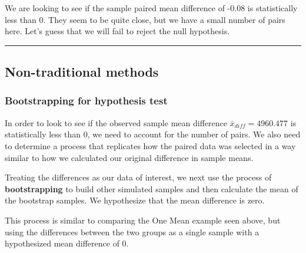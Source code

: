 \documentclass[12pt,]{krantz}
\makeatletter
\newenvironment{Shaded}{\begin{snugshade}}{\end{snugshade}}
\newcommand{\KeywordTok}[1]{\textcolor[rgb]{0.27,0.27,0.27}{\textbf{#1}}}
\newcommand{\DataTypeTok}[1]{\textcolor[rgb]{0.27,0.27,0.27}{#1}}
\newcommand{\DecValTok}[1]{\textcolor[rgb]{0.06,0.06,0.06}{#1}}
\newcommand{\StringTok}[1]{\textcolor[rgb]{0.5,0.5,0.5}{#1}}
\newcommand{\OperatorTok}[1]{\textcolor[rgb]{0.43,0.43,0.43}{\textbf{#1}}}
\newcommand{\NormalTok}[1]{#1}
\newenvironment{kframe}{%
\medskip{}
\setlength{\fboxsep}{.8em}
 \def\at@end@of@kframe{}%
 \ifinner\ifhmode%
  \def\at@end@of@kframe{\end{minipage}}%
  \begin{minipage}{\columnwidth}%
 \fi\fi%
 \def\FrameCommand##1{\hskip\@totalleftmargin \hskip-\fboxsep
 \colorbox{shadecolor}{##1}\hskip-\fboxsep
     \hskip-\linewidth \hskip-\@totalleftmargin \hskip\columnwidth}%
 \MakeFramed {\advance\hsize-\width
   \@totalleftmargin\z@ \linewidth\hsize
   \@setminipage}}%
 {\par\unskip\endMakeFramed%
 \at@end@of@kframe}
\renewenvironment{Shaded}{\begin{kframe}}{\end{kframe}}
\makeatother
\begin{document}
We are looking to see if the sample paired mean difference of -0.08 is
statistically less than 0. They seem to be quite close, but we have a
small number of pairs here. Let's guess that we will fail to reject the
null hypothesis.

\begin{center}\rule{0.5\linewidth}{\linethickness}\end{center}

\subsection{Non-traditional methods}\label{non-traditional-methods-4}

\subsubsection*{Bootstrapping for hypothesis
test}\label{bootstrapping-for-hypothesis-test-1}


In order to look to see if the observed sample mean difference
\(\bar{x}_{diff} = 4960.477\) is statistically less than 0, we need to
account for the number of pairs. We also need to determine a process
that replicates how the paired data was selected in a way similar to how
we calculated our original difference in sample means.

Treating the differences as our data of interest, we next use the
process of \textbf{bootstrapping} to build other simulated samples and
then calculate the mean of the bootstrap samples. We hypothesize that
the mean difference is zero.

This process is similar to comparing the One Mean example seen above,
but using the differences between the two groups as a single sample with
a hypothesized mean difference of 0.

\begin{Shaded}
\end{Shaded}
\end{document}
